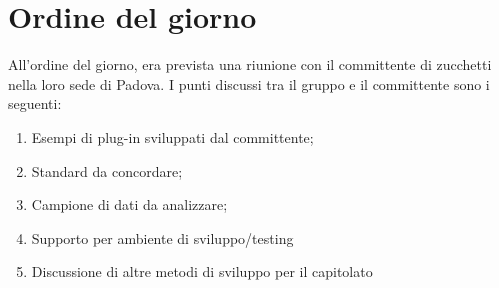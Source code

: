 \section{Ordine del giorno}
All'ordine del giorno, era prevista una riunione  con il committente di zucchetti nella loro sede di Padova. 
I punti discussi tra il gruppo e il committente sono i seguenti: 
\begin{enumerate}
	\item Esempi di plug-in sviluppati dal committente; 
	\item Standard da concordare; 
	\item Campione di dati da analizzare; 
	\item Supporto per ambiente di sviluppo/testing 
	\item Discussione di altre metodi di sviluppo per il capitolato
\end{enumerate}
